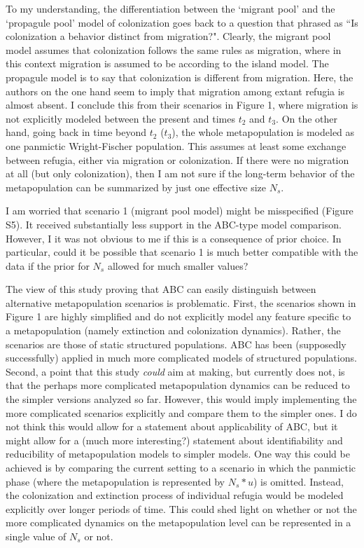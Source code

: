 \documentclass[11pt]{article}
\newenvironment{my_enumerate}
{\begin{enumerate}
  \setlength{\itemsep}{2pt}
  \setlength{\parskip}{0pt}
  \setlength{\parsep}{0pt}}
{\end{enumerate}}
\begin{document}
\begin{my_enumerate}
	\item To my understanding, the differentiation between the `migrant pool' and the `propagule pool' model of colonization goes back to a question that \citet{Wade:1988fk} phrased as ``Is colonization a behavior distinct from migration?". Clearly, the migrant pool model assumes that colonization follows the same rules as migration, where in this context migration is assumed to be according to the island model. The propagule model is to say that colonization is different from migration. Here, the authors on the one hand seem to imply that migration among extant refugia is almost absent. I conclude this from their scenarios in Figure 1, where migration is not explicitly modeled between the present and times $t_2$ and $t_3$. On the other hand, going back in time beyond $t_2$ ($t_3$), the whole metapopulation is modeled as one panmictic Wright-Fischer population. This assumes at least some exchange between refugia, either via migration or colonization. If there were no migration at all (but only colonization), then I am not sure if the long-term behavior of the metapopulation can be summarized by just one effective size $N_s$.
	\item I am worried that scenario 1 (migrant pool model) might be misspecified (Figure S5). It received substantially less support in the ABC-type model comparison. However, I it was not obvious to me if this is a consequence of prior choice. In particular, could it be possible that scenario 1 is much better compatible with the data if the prior for $N_s$ allowed for much smaller values?
	\item The view of this study proving that ABC can easily distinguish between alternative metapopulation scenarios is problematic. First, the scenarios shown in Figure 1 are highly simplified and do not explicitly model any feature specific to a metapopulation (namely extinction and colonization dynamics). Rather, the scenarios are those of static structured populations. ABC has been (supposedly successfully) applied in much more complicated models of structured populations. Second, a point that this study \emph{could} aim at making, but currently does not, is that the perhaps more complicated metapopulation dynamics can be reduced to the simpler versions analyzed so far. However, this would imply implementing the more complicated scenarios explicitly and compare them to the simpler ones. I do not think this would allow for a statement about applicability of ABC, but it might allow for a (much more interesting?) statement about identifiability and reducibility of metapopulation models to simpler models. One way this could be achieved is by comparing the current setting to a scenario in which the panmictic phase (where the metapopulation is represented by $N_s * u$) is omitted. Instead, the colonization and extinction process of individual refugia would be modeled explicitly over longer periods of time. This could shed light on whether or not the more complicated dynamics on the metapopulation level can be represented in a single value of $N_s$ or not.

\end{my_enumerate}
\end{document}
